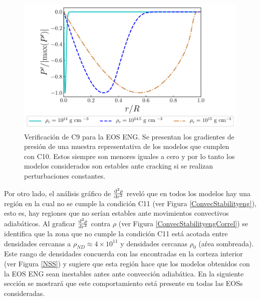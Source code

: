 \begin{figure}[H]
    \centering
    \includegraphics[width=0.93\linewidth]{figures/CrackStabilityeng.pdf}
    \caption[Verificación de C9 para la EOS ENG]{Verificación de C9 para la EOS ENG. Se presentan los gradientes de presión de una muestra representativa de los modelos que cumplen con C10. Estos siempre son menores  iguales a cero  y por lo tanto los modelos considerados son estables ante cracking si se realizan perturbaciones constantes.}
    \label{CrackStabilityeng}
\end{figure}
Por otro lado, el análisis gráfico de $\dv[2]{\rho}{r}$ reveló que en todos los modelos hay una región en la cual no se cumple la condición C11 (ver Figura \ref{ConvecStabilityeng}), esto es, hay regiones que no serían estables ante movimientos convectivos adiabáticos. Al graficar $\dv[2]{\rho}{r}$ contra $\rho$ (ver Figura \ref{ConvecStabilityengCorrel}) se identifica que la zona que no cumple la condición C11 está acotada entre densidades cercanas a $\rho_{ND}\approx 4 \times 10^{11} $ y densidades cercanas $\rho_0$ (aŕea sombreada). Este rango de densidades concuerda con las encontradas en la corteza interior (ver Figura \ref{NSS}) y sugiere que esta región hace que los modelos obtenidos con la EOS ENG sean inestables antes ante convección adiabática. En la siguiente sección se mostrará que este comportamiento está presente en todas las EOSs consideradas.
